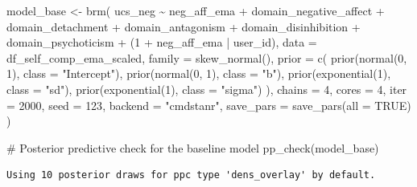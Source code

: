 \documentclass[
  11pt,
  a4paper,
  onecolumn]{article}
\newenvironment{Shaded}{}{}
\newcommand{\AttributeTok}[1]{\textcolor[rgb]{0.84,0.23,0.29}{#1}}
\newcommand{\CommentTok}[1]{\textcolor[rgb]{0.42,0.45,0.49}{#1}}
\newcommand{\ConstantTok}[1]{\textcolor[rgb]{0.00,0.36,0.77}{#1}}
\newcommand{\DecValTok}[1]{\textcolor[rgb]{0.00,0.36,0.77}{#1}}
\newcommand{\FunctionTok}[1]{\textcolor[rgb]{0.44,0.26,0.76}{#1}}
\newcommand{\NormalTok}[1]{\textcolor[rgb]{0.14,0.16,0.18}{#1}}
\newcommand{\OtherTok}[1]{\textcolor[rgb]{0.44,0.26,0.76}{#1}}
\newcommand{\SpecialCharTok}[1]{\textcolor[rgb]{0.00,0.36,0.77}{#1}}
\newcommand{\StringTok}[1]{\textcolor[rgb]{0.01,0.18,0.38}{#1}}
\begin{document}
\begin{Shaded}
\begin{Highlighting}[]
\NormalTok{model\_base }\OtherTok{\textless{}{-}} \FunctionTok{brm}\NormalTok{(}
\NormalTok{  ucs\_neg }\SpecialCharTok{\textasciitilde{}}\NormalTok{ neg\_aff\_ema }\SpecialCharTok{+} 
\NormalTok{    domain\_negative\_affect }\SpecialCharTok{+}\NormalTok{ domain\_detachment }\SpecialCharTok{+}
\NormalTok{    domain\_antagonism }\SpecialCharTok{+}\NormalTok{ domain\_disinhibition }\SpecialCharTok{+}\NormalTok{ domain\_psychoticism }\SpecialCharTok{+} 
\NormalTok{    (}\DecValTok{1} \SpecialCharTok{+}\NormalTok{ neg\_aff\_ema }\SpecialCharTok{|}\NormalTok{ user\_id),}
  \AttributeTok{data =}\NormalTok{ df\_self\_comp\_ema\_scaled,}
  \AttributeTok{family =} \FunctionTok{skew\_normal}\NormalTok{(),}
  \AttributeTok{prior =} \FunctionTok{c}\NormalTok{(}
    \FunctionTok{prior}\NormalTok{(}\FunctionTok{normal}\NormalTok{(}\DecValTok{0}\NormalTok{, }\DecValTok{1}\NormalTok{), }\AttributeTok{class =} \StringTok{"Intercept"}\NormalTok{),}
    \FunctionTok{prior}\NormalTok{(}\FunctionTok{normal}\NormalTok{(}\DecValTok{0}\NormalTok{, }\DecValTok{1}\NormalTok{), }\AttributeTok{class =} \StringTok{"b"}\NormalTok{),}
    \FunctionTok{prior}\NormalTok{(}\FunctionTok{exponential}\NormalTok{(}\DecValTok{1}\NormalTok{), }\AttributeTok{class =} \StringTok{"sd"}\NormalTok{),}
    \FunctionTok{prior}\NormalTok{(}\FunctionTok{exponential}\NormalTok{(}\DecValTok{1}\NormalTok{), }\AttributeTok{class =} \StringTok{"sigma"}\NormalTok{)}
\NormalTok{  ),}
  \AttributeTok{chains =} \DecValTok{4}\NormalTok{,}
  \AttributeTok{cores =} \DecValTok{4}\NormalTok{,}
  \AttributeTok{iter =} \DecValTok{2000}\NormalTok{,}
  \AttributeTok{seed =} \DecValTok{123}\NormalTok{,}
  \AttributeTok{backend =} \StringTok{"cmdstanr"}\NormalTok{,}
  \AttributeTok{save\_pars =} \FunctionTok{save\_pars}\NormalTok{(}\AttributeTok{all =} \ConstantTok{TRUE}\NormalTok{)}
\NormalTok{)}
\end{Highlighting}
\end{Shaded}

\begin{Shaded}
\begin{Highlighting}[]
\CommentTok{\# Posterior predictive check for the baseline model}
\FunctionTok{pp\_check}\NormalTok{(model\_base)}
\end{Highlighting}
\end{Shaded}

\begin{verbatim}
Using 10 posterior draws for ppc type 'dens_overlay' by default.
\end{verbatim}
\end{document}
